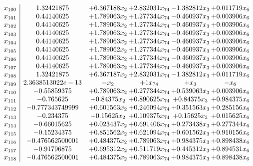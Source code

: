\documentclass[11pt]{article}
\begin{document}
\[\begin{array}{c| c c@{\hskip 2pt} c@{\hskip 2pt} c@{\hskip 2pt} c@{\hskip 2pt} }
 x_{100}   &  1.32421875 & + 6.367188 x_{2} & + 2.832031 x_{74} & -1.382812 x_{3} & + 0.011719 x_{6}\\
 x_{101}   &  0.44140625 & + 1.789063 x_{2} & + 1.277344 x_{74} & -0.460937 x_{3} & + 0.003906 x_{6}\\
 x_{102}   &  0.44140625 & + 1.789063 x_{2} & + 1.277344 x_{74} & -0.460937 x_{3} & + 0.003906 x_{6}\\
 x_{103}   &  0.44140625 & + 1.789063 x_{2} & + 1.277344 x_{74} & -0.460937 x_{3} & + 0.003906 x_{6}\\
 x_{104}   &  0.44140625 & + 1.789063 x_{2} & + 1.277344 x_{74} & -0.460937 x_{3} & + 0.003906 x_{6}\\
 x_{105}   &  0.44140625 & + 1.789062 x_{2} & + 1.277344 x_{74} & -0.460937 x_{3} & + 0.003906 x_{6}\\
 x_{106}   &  0.44140625 & + 1.789063 x_{2} & + 1.277344 x_{74} & -0.460937 x_{3} & + 0.003906 x_{6}\\
 x_{107}   &  0.44140625 & + 1.789063 x_{2} & + 1.277344 x_{74} & -0.460937 x_{3} & + 0.003906 x_{6}\\
 x_{108}   &  1.32421875 & + 6.367187 x_{2} & + 2.832031 x_{74} & -1.382812 x_{3} & + 0.011719 x_{6}\\
 x_{109}   &  2.3638513022e-13 & - x_{2} & + 1 x_{74} & +  x_{3} & - x_{6}\\
 x_{110}   &  -0.55859375 & + 0.789063 x_{2} & + 0.277344 x_{74} & + 0.539063 x_{3} & + 0.003906 x_{6}\\
 x_{111}   &  -0.765625 & + 0.84375 x_{2} & + 0.890625 x_{74} & + 0.84375 x_{3} & + 0.984375 x_{6}\\
 x_{112}   &  -0.777343749999 & + 0.601563 x_{2} & + 0.246094 x_{74} & + 0.351563 x_{3} & + 0.285156 x_{6}\\
 x_{113}   &  -0.234375 & + 0.15625 x_{2} & + 0.109375 x_{74} & + 0.15625 x_{3} & + 0.015625 x_{6}\\
 x_{114}   &  -0.66015625 & + 0.023437 x_{2} & + 0.691406 x_{74} & + 0.273438 x_{3} & + 0.277344 x_{6}\\
 x_{115}   &  -0.15234375 & + 0.851562 x_{2} & + 0.621094 x_{74} & + 0.601562 x_{3} & + 0.910156 x_{6}\\
 x_{116}   &  -0.476562500001 & + 0.484375 x_{2} & + 0.789063 x_{74} & + 0.984375 x_{3} & + 0.898438 x_{6}\\
 x_{117}   &  -0.91796875 & + 0.695312 x_{2} & + 0.511719 x_{74} & + 0.445312 x_{3} & + 0.894531 x_{6}\\
 x_{118}   &  -0.476562500001 & + 0.484375 x_{2} & + 0.789063 x_{74} & + 0.984375 x_{3} & + 0.898438 x_{6}\\

\end{array}\]
\end{document}
